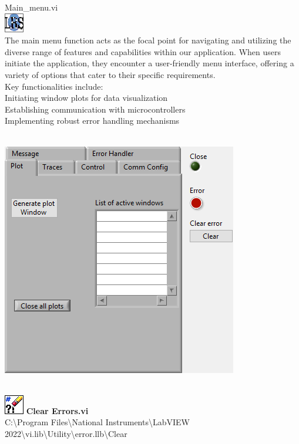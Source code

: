 \documentclass[
]{article}
\author{}
\date{}
\begin{document}
\hfill\break
Main\_menu.vi\\
\includegraphics{LVtemp20240312184737_0_0c.png}\\
The main menu function acts as the focal point for navigating and
utilizing the diverse range of features and capabilities within our
application. When users initiate the application, they encounter a
user-friendly menu interface, offering a variety of options that cater
to their specific requirements.\\
Key functionalities include:\\
Initiating window plots for data visualization\\
Establishing communication with microcontrollers\\
Implementing robust error handling mechanisms\\
\strut \\
\includegraphics{LVtemp20240312184737_1_0.png}\\
\strut \\
\includegraphics{Clear_Errors_viLVtemp20240312184737_2_0.png}
\textbf{Clear Errors.vi\\
} C:\textbackslash Program Files\textbackslash National
Instruments\textbackslash LabVIEW
2022\textbackslash vi.lib\textbackslash Utility\textbackslash error.llb\textbackslash Clear
\end{document}
